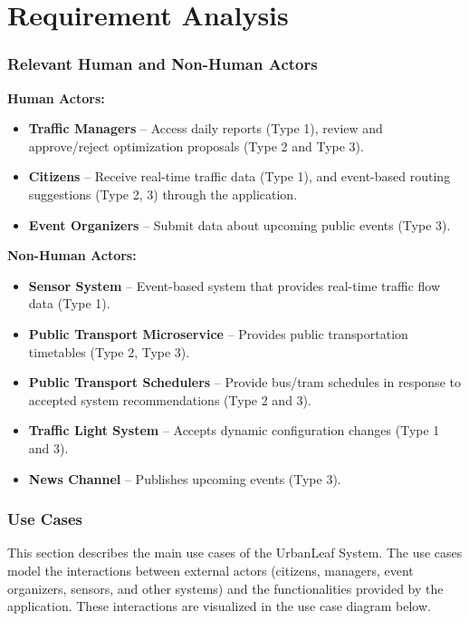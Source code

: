 \chapter{Requirement Analysis}

\subsection{Relevant Human and Non-Human Actors}

\textbf{Human Actors:}
\begin{itemize}
    \item \textbf{Traffic Managers} – Access daily reports (Type 1), review and approve/reject optimization proposals (Type 2 and Type 3).
    \item \textbf{Citizens} – Receive real-time traffic data (Type 1), and event-based routing suggestions (Type 2, 3) through the application.
    
    \item \textbf{Event Organizers} – Submit data about upcoming public events (Type 3).
\end{itemize}



\textbf{Non-Human Actors:}
\begin{itemize}
    \item \textbf{Sensor System} – Event-based system that provides real-time traffic flow data (Type 1).
    \item \textbf{Public Transport Microservice} – Provides public transportation timetables (Type 2, Type 3).
    \item \textbf{Public Transport Schedulers} – Provide bus/tram schedules in response to accepted system recommendations (Type 2 and 3).
    \item \textbf{Traffic Light System} – Accepts dynamic configuration changes (Type 1 and 3).
    \item \textbf{News Channel} – Publishes upcoming events (Type 3).
    
\end{itemize}

\newpage
\subsection{Use Cases}

This section describes the main use cases of the UrbanLeaf System. The use cases model the interactions between external actors (citizens, managers, event organizers, sensors, and other systems) and the functionalities provided by the application. These interactions are visualized in the use case diagram below.

